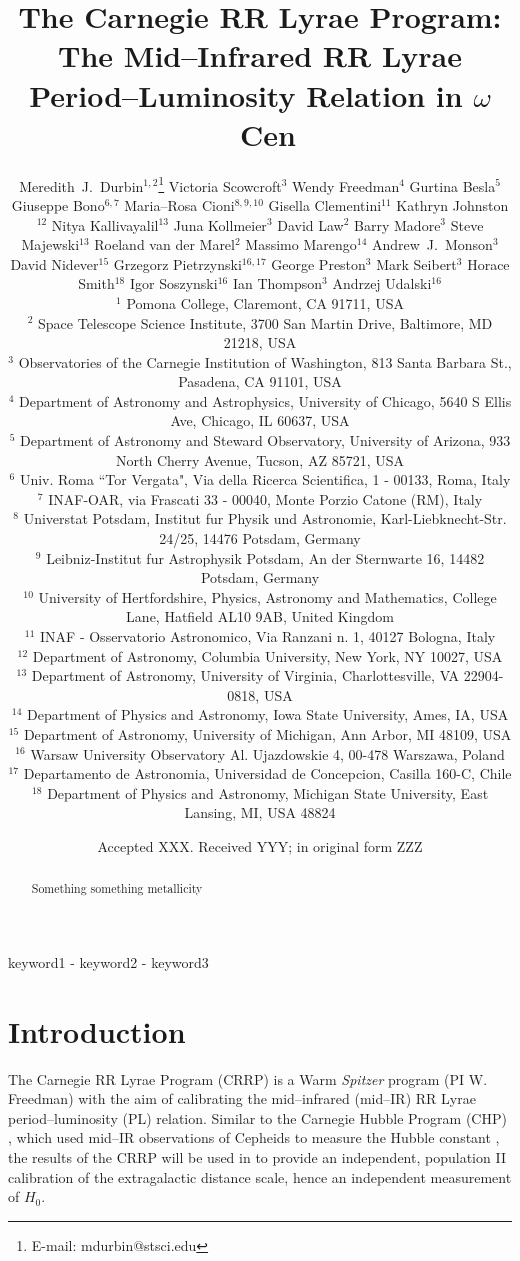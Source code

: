 \documentclass[a4paper,fleqn,usenatbib]{mnras}
\title[Mid--IR RR Lyrae PL Relation in $\omega$ Cen]{The Carnegie RR Lyrae Program: The Mid--Infrared RR Lyrae Period--Luminosity Relation in $\omega$~Cen}
\author[M.~J.~Durbin et al.]{Meredith~J.~Durbin$^{1,2}$\thanks{E-mail: mdurbin@stsci.edu}
Victoria Scowcroft$^{3}$
Wendy Freedman$^{4}$
Gurtina Besla$^{5}$ 
\newauthor Giuseppe Bono$^{6, 7}$
Maria--Rosa Cioni$^{8, 9, 10}$
Gisella Clementini$^{11}$
Kathryn Johnston$^{12}$
\newauthor Nitya Kallivayalil$^{13}$
Juna Kollmeier$^{3}$
David Law$^{2}$
Barry Madore$^{3}$
Steve Majewski$^{13}$
\newauthor Roeland van der Marel$^{2}$
Massimo Marengo$^{14}$
Andrew~J.~Monson$^{3}$
David Nidever$^{15}$ 
\newauthor
Grzegorz Pietrzynski$^{16, 17}$
George Preston$^{3}$
Mark Seibert$^{3}$
Horace Smith$^{18}$
\newauthor Igor Soszynski$^{16}$
Ian Thompson$^{3}$
Andrzej Udalski$^{16}$
\\
$^1$ Pomona College, Claremont, CA 91711, USA \\
$^2$ Space Telescope Science Institute, 3700 San Martin Drive, Baltimore, MD 21218, USA \\
$^3$ Observatories of the Carnegie Institution of Washington, 813 Santa Barbara St., Pasadena, CA 91101, USA \\
$^4$ Department of Astronomy and Astrophysics, University of Chicago, 5640 S Ellis Ave, Chicago, IL 60637, USA \\
$^5$ Department of Astronomy and Steward Observatory, University of Arizona, 933 North Cherry Avenue,   Tucson, AZ 85721, USA \\
$^6$ Univ. Roma ``Tor Vergata", Via della Ricerca Scientifica, 1 - 00133, Roma, Italy \\
$^7$ INAF-OAR, via Frascati 33 - 00040, Monte Porzio Catone (RM), Italy \\
$^8$ Universtat Potsdam, Institut fur Physik und Astronomie, Karl-Liebknecht-Str. 24/25, 14476 Potsdam, Germany \\
$^9$ Leibniz-Institut fur Astrophysik Potsdam, An der Sternwarte 16, 14482 Potsdam, Germany \\
$^{10}$ University of Hertfordshire, Physics, Astronomy and Mathematics, College Lane, Hatfield AL10 9AB, United Kingdom \\
$^{11}$ INAF - Osservatorio Astronomico, Via Ranzani n. 1, 40127 Bologna, Italy \\
$^{12}$ Department of Astronomy, Columbia University, New York, NY 10027, USA  \\
$^{13}$ Department of Astronomy, University of Virginia, Charlottesville, VA 22904-0818, USA \\
$^{14}$ Department of Physics and Astronomy, Iowa State University, Ames, IA, USA \\
$^{15}$ Department of Astronomy, University of Michigan, Ann Arbor, MI 48109, USA \\
$^{16}$ Warsaw University Observatory Al. Ujazdowskie 4, 00-478 Warszawa, Poland \\
$^{17}$ Departamento de Astronomia, Universidad de Concepcion, Casilla 160-C, Chile \\
$^{18}$ Department of Physics and Astronomy, Michigan State University, East Lansing, MI, USA 48824 \\
}
\date{Accepted XXX. Received YYY; in original form ZZZ}
\begin{document}
\label{firstpage}
\pagerange{\pageref{firstpage}-\pageref{lastpage}}
\maketitle

\begin{abstract}
Something something metallicity
\end{abstract}

\begin{keywords}
keyword1 - keyword2 - keyword3
\end{keywords}






\section{Introduction}
\label{sec:intro}

The Carnegie RR Lyrae Program (CRRP) is a Warm {\it Spitzer} program (PI W. Freedman) with the aim of calibrating the mid--infrared (mid--IR) RR Lyrae period--luminosity (PL) relation. Similar to the Carnegie Hubble Program (CHP) \citep{2011AJ....142..192F}, which used mid--IR observations of Cepheids to measure the Hubble constant \citep[$H_{0}$][]{2012ApJ...758...24F}, the results of the CRRP will be used in to provide an independent, population II calibration of the extragalactic distance scale, hence an independent measurement of $H_{0}$. 
\end{document}
